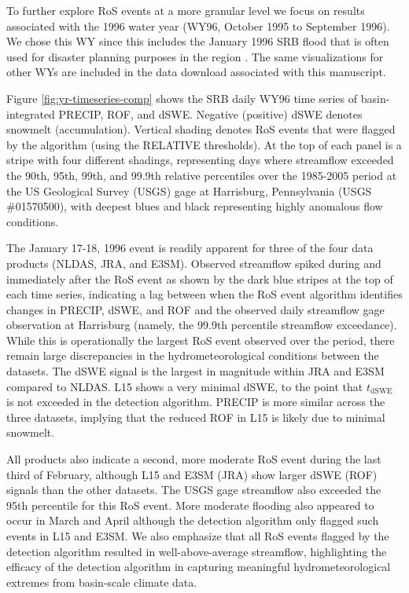 \documentclass[nhess, manuscript]{copernicus}
\begin{document}
To further explore RoS events at a more granular level we focus on results associated with the 1996 water year (WY96, October 1995 to September 1996).
We chose this WY since this includes the January 1996 SRB flood that is often used for disaster planning purposes in the region \citep{army2001non}.
The same visualizations for other WYs are included in the data download associated with this manuscript.

Figure \ref{fig:yr-timeseries-comp} shows the SRB daily WY96 time series of basin-integrated PRECIP, ROF, and dSWE.
Negative (positive) dSWE denotes snowmelt (accumulation).
Vertical shading denotes RoS events that were flagged by the algorithm (using the RELATIVE thresholds).
At the top of each panel is a stripe with four different shadings, representing days where streamflow exceeded the 90th, 95th, 99th, and 99.9th relative percentiles over the 1985-2005 period at the US Geological Survey (USGS) gage at Harrisburg, Pennsylvania (USGS \#01570500), with deepest blues and black representing highly anomalous flow conditions.

The January 17-18, 1996 event is readily apparent for three of the four data products (NLDAS, JRA, and E3SM).
Observed streamflow spiked during and immediately after the RoS event as shown by the dark blue stripes at the top of each time series, indicating a lag between when the RoS event algorithm identifies changes in PRECIP, dSWE, and ROF and the observed daily streamflow gage observation at Harrisburg (namely, the 99.9th percentile streamflow exceedance).
While this is operationally the largest RoS event observed over the period, there remain large discrepancies in the hydrometeorological conditions between the datasets.
The dSWE signal is the largest in magnitude within JRA and E3SM compared to NLDAS.
L15 shows a very minimal dSWE, to the point that $t_{\textrm{dSWE}}$ is not exceeded in the detection algorithm.
PRECIP is more similar across the three datasets, implying that the reduced ROF in L15 is likely due to minimal snowmelt.

All products also indicate a second, more moderate RoS event during the last third of February, although L15 and E3SM (JRA) show larger dSWE (ROF) signals than the other datasets.
The USGS gage streamflow also exceeded the 95th percentile for this RoS event.
More moderate flooding also appeared to occur in March and April although the detection algorithm only flagged such events in L15 and E3SM.
We also emphasize that all RoS events flagged by the detection algorithm resulted in well-above-average streamflow, highlighting the efficacy of the detection algorithm in capturing meaningful hydrometeorological extremes from basin-scale climate data.
\end{document}
